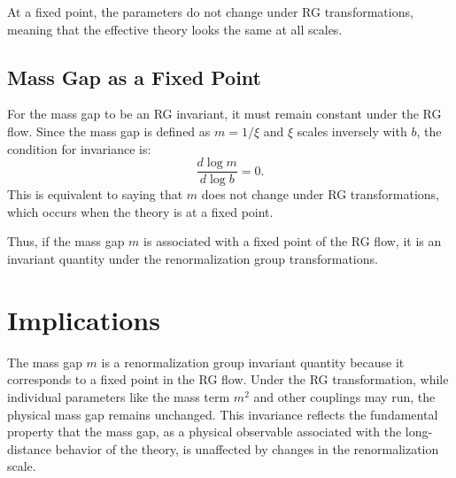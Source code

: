 At a fixed point, the parameters do not change under RG transformations, meaning that the effective theory looks the same at all scales.

\subsection{Mass Gap as a Fixed Point}

For the mass gap to be an RG invariant, it must remain constant under the RG flow. Since the mass gap is defined as \(m = 1/\xi\) and \(\xi\) scales inversely with \(b\), the condition for invariance is:
\begin{equation}
\frac{d\log m}{d\log b} = 0.
\end{equation}
This is equivalent to saying that \(m\) does not change under RG transformations, which occurs when the theory is at a fixed point.

Thus, if the mass gap \(m\) is associated with a fixed point of the RG flow, it is an invariant quantity under the renormalization group transformations.



\section{Implications}

The mass gap \(m\) is a renormalization group invariant quantity because it corresponds to a fixed point in the RG flow. Under the RG transformation, while individual parameters like the mass term \(m^2\) and other couplings may run, the physical mass gap remains unchanged. This invariance reflects the fundamental property that the mass gap, as a physical observable associated with the long-distance behavior of the theory, is unaffected by changes in the renormalization scale.
